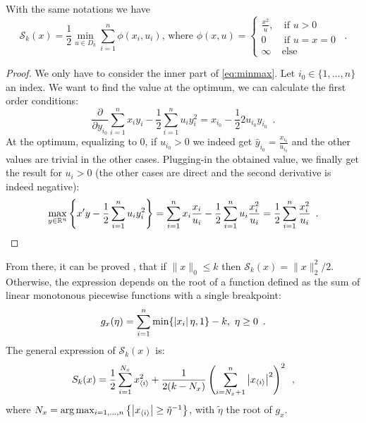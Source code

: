 \begin{proposition}\label{prop:Sfromphi} With the same notations we have 
\begin{equation}\mathcal{S}_k(x) = \frac{1}{2}\min_{u\in D_k} \sum_{i=1}^n \phi(x_i, u_i)\text{, where }
\phi(x,u)=\begin{cases}\frac{x^2}{u},&\ \text{if }u>0\\ 0&\ \text{if }u=x=0\\ \infty &\text{else} \end{cases}\enspace.\end{equation}
\end{proposition}
\begin{proof}
We only have to consider the inner part of \eqref{eq:minmax}. Let $i_0\in\{1,\dots,n\}$ an index. We want to find the value at the optimum, we can calculate the first order conditions:
\[ \frac{\partial}{\partial y_{i_0}} \sum_{i=1}^n x_iy_i -\frac{1}{2}\sum_{i=1}^n u_iy_i^2 = x_{i_0} - \frac{1}{2}2u_{i_0}y_{i_0}\enspace.\]
At the optimum, equalizing to $0$, if $u_{i_0}>0$ we indeed get $\hat y_{i_0} = \frac{x_{i_0}}{u_{i_0}}$ and the other values are trivial in the other cases. Plugging-in the obtained value, we finally get the result for $u_i>0$ (the other cases are direct and the second derivative is indeed negative):
\[\max_{y\in\mathbb{R}^n}\left\{x'y - \frac{1}{2}\sum_{i=1}^nu_iy_i^2\right\} = \sum_{i=1}^nx_i \frac{x_i}{u_i} - \frac{1}{2}\sum_{i=1}^n u_i \frac{x_i^2}{u_i} = \frac{1}{2}\sum_{i=1}^n \frac{x_i^2}{u_i}\enspace.\]
\end{proof}

From there, it can be proved \cite{beck}, that if $\|x\|_0\leq k$ then $\mathcal{S}_k(x)=\|x\|_2^2 /2$. Otherwise, the expression depends on the root of a function defined as the sum of linear monotonous piecewise functions with a single breakpoint:
\begin{equation}\label{eq:applyalgofunc}
g_x(\eta)=\sum_{i=1}^n \min\{\left|x_i\right|\eta,1\} - k,\ \eta\geq 0\enspace.
\end{equation}
The general expression of $\mathcal{S}_k(x)$ is:
\begin{equation}
    S_k(x)=\frac{1}{2}\sum_{i=1}^{N_x} x_{\langle i \rangle}^2 + \frac{1}{2(k- N_x)}\left(\sum_{i=N_x+1}^n\left|x_{\langle i\rangle}\right|^2\right)^2\enspace,
\end{equation}
where $N_x=\arg\max_{i=1,\dots,n}\left\{\left|x_{\langle i\rangle}\right|\geq\tilde\eta ^{-1}\right\}$, with $\tilde \eta$ the root of $g_x$.